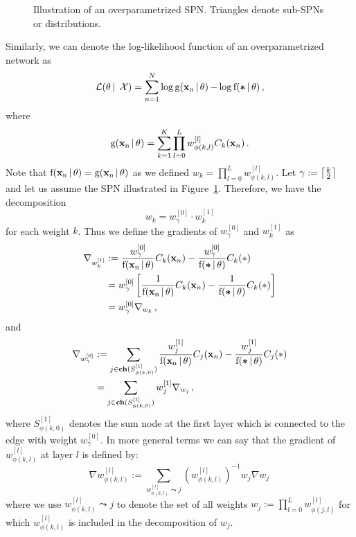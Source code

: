 \documentclass{article}
\DeclarePairedDelimiter\ceil{\lceil}{\rceil}
\DeclareMathOperator*{\f}{f(\xn \,|\, \theta)}
\DeclareMathOperator*{\fz}{f(\bm \ast \,|\, \theta)}
\DeclareMathOperator*{\fdeep}{g(\xn \,|\, \theta)}
\newcommand{\wa}{w^{[0]}_{\gamma}}
\newcommand{\wb}{w^{[1]}_{k}}
\begin{document}
\begin{figure}[t]
  \centering
  
  \caption{Illustration of an overparametrized SPN. Triangles denote sub-SPNs or distributions.}
  \label{fig:deep}
\end{figure}

Similarly, we can denote the log-likelihood function of an overparametrized network as
\begin{equation} \label{eq:deepLLH}
\mathcal{L}(\theta\, | \, \mathcal{X}) = \sum_{n=1}^N \log \fdeep - \log \fz \, ,
\end{equation}
where
\[
\fdeep = \sum_{k=1}^K \prod_{l=0}^L w^{[l]}_{\phi(k, l)} C_k(\xn) \, .
\]
Note that $\f = \fdeep$ as we defined $w_k = \prod_{l=0}^L w^{[l]}_{\phi(k, l)}$.
Let $\gamma := \ceil*{\frac{k}{2}}$ and let us assume the SPN illustrated in Figure~\ref{fig:deep}.
Therefore, we have the decomposition 
\[
w_k = \wa \cdot \wb
\]
for each weight $k$. Thus we define the gradients of $\wa$ and $\wb$ as
\begin{align}
  \begin{aligned}
  \nabla_{\wb} &:= \frac{\wa}{\f} C_k(\xn) - \frac{\wa}{\fz} C_k(\ast) \\
  &= \wa \left[ \frac{1}{\f} C_k(\xn) - \frac{1}{\fz} C_k(\ast) \right] \\
  &= \wa \nabla_{w_k} \, ,
  \end{aligned}
\end{align}
and
\begin{align}
  \begin{aligned}
  \nabla_{\wa} &:= \sum_{j \in \ch(S^{[1]}_{\phi(k,0)})} \frac{w^{[1]}_j}{\f} C_j(\xn) - \frac{w^{[1]}_j}{\fz} C_j(\ast) \\
  &= \sum_{j \in \ch(S^{[1]}_{\phi(k,0)})} w^{[1]}_j \nabla_{w_j} \, ,
\end{aligned}
\end{align}
where $S^{[1]}_{\phi(k,0)}$ denotes the sum node at the first layer which is connected to the edge with weight $\wa$.
In more general terms we can say that the gradient of $w^{[l]}_{\phi(k, l)}$ at layer $l$ is defined by:
\begin{equation} \label{eq:generalGradients}
  \nabla w^{[l]}_{\phi(k, l)} := \sum_{w^{[l]}_{\phi(k, l)} \leadsto j} (w^{[l]}_{\phi(k, l)})^{-1} w_j \nabla{w_j} \,
\end{equation}
where we use $w^{[l]}_{\phi(k, l)} \leadsto j$ to denote the set of all weights $w_j:= \prod_{l=0}^L w^{[l]}_{\phi(j, l)}$ for which $w^{[l]}_{\phi(k, l)}$ is included in the decomposition of $w_j$.
\end{document}
